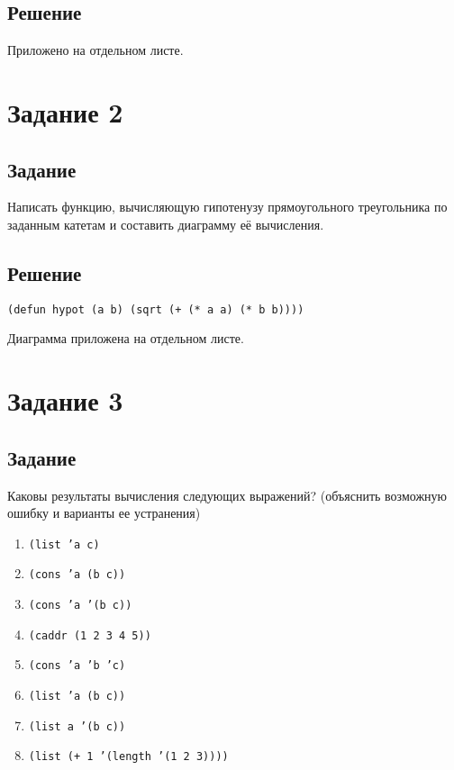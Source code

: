 \subsection*{Решение}
Приложено на отдельном листе.

\section{Задание 2}
\subsection*{Задание}
Написать функцию, вычисляющую гипотенузу прямоугольного треугольника по заданным катетам и составить диаграмму её вычисления.


\subsection*{Решение}
\begin{code}
\begin{verbatim}
(defun hypot (a b) (sqrt (+ (* a a) (* b b))))
\end{verbatim}
\end{code}

Диаграмма приложена на отдельном листе.

\section{Задание 3}
\subsection*{Задание}
Каковы результаты вычисления следующих выражений? (объяснить возможную ошибку и варианты ее устранения)

\begin{enumerate}
	\item \texttt{(list 'a c)}
	\item \texttt{(cons 'a (b c))}
	\item \texttt{(cons 'a '(b c))}
	\item \texttt{(caddr (1 2 3 4 5))}
	\item \texttt{(cons 'a 'b 'c)}
	\item \texttt{(list 'a (b c))}
	\item \texttt{(list a '(b c))}
	\item \texttt{(list (+ 1 '(length '(1 2 3))))}
\end{enumerate}


